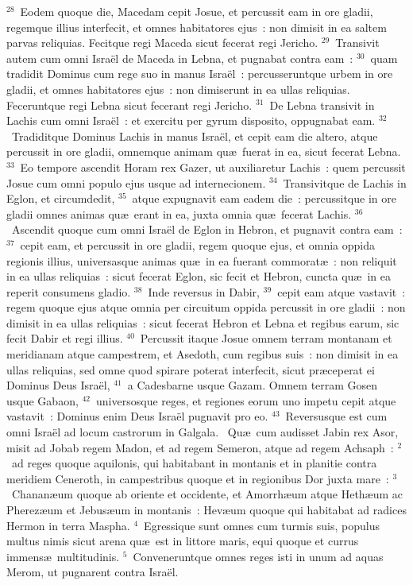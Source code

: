 ${}^{28}$~Eodem quoque die, Macedam cepit Josue, et percussit eam in ore gladii, regemque illius interfecit, et omnes habitatores ejus~: non dimisit in ea saltem parvas reliquias. Fecitque regi Maceda sicut fecerat regi Jericho.
${}^{29}$~Transivit autem cum omni Isra\"el de Maceda in Lebna, et pugnabat contra eam~:
${}^{30}$~quam tradidit Dominus cum rege suo in manus Isra\"el~: percusseruntque urbem in ore gladii, et omnes habitatores ejus~: non dimiserunt in ea ullas reliquias. Feceruntque regi Lebna sicut fecerant regi Jericho.
${}^{31}$~De Lebna transivit in Lachis cum omni Isra\"el~: et exercitu per gyrum disposito, oppugnabat eam.
${}^{32}$~Tradiditque Dominus Lachis in manus Isra\"el, et cepit eam die altero, atque percussit in ore gladii, omnemque animam qu\ae\ fuerat in ea, sicut fecerat Lebna.
${}^{33}$~Eo tempore ascendit Horam rex Gazer, ut auxiliaretur Lachis~: quem percussit Josue cum omni populo ejus usque ad internecionem.
${}^{34}$~Transivitque de Lachis in Eglon, et circumdedit,
${}^{35}$~atque expugnavit eam eadem die~: percussitque in ore gladii omnes animas qu\ae\ erant in ea, juxta omnia qu\ae\ fecerat Lachis.
${}^{36}$~Ascendit quoque cum omni Isra\"el de Eglon in Hebron, et pugnavit contra eam~:
${}^{37}$~cepit eam, et percussit in ore gladii, regem quoque ejus, et omnia oppida regionis illius, universasque animas qu\ae\ in ea fuerant commorat\ae~: non reliquit in ea ullas reliquias~: sicut fecerat Eglon, sic fecit et Hebron, cuncta qu\ae\ in ea reperit consumens gladio.
${}^{38}$~Inde reversus in Dabir,
${}^{39}$~cepit eam atque vastavit~: regem quoque ejus atque omnia per circuitum oppida percussit in ore gladii~: non dimisit in ea ullas reliquias~: sicut fecerat Hebron et Lebna et regibus earum, sic fecit Dabir et regi illius.
${}^{40}$~Percussit itaque Josue omnem terram montanam et meridianam atque campestrem, et Asedoth, cum regibus suis~: non dimisit in ea ullas reliquias, sed omne quod spirare poterat interfecit, sicut pr\ae ceperat ei Dominus Deus Isra\"el,
${}^{41}$~a Cadesbarne usque Gazam. Omnem terram Gosen usque Gabaon,
${}^{42}$~universosque reges, et regiones eorum uno impetu cepit atque vastavit~: Dominus enim Deus Isra\"el pugnavit pro eo.
${}^{43}$~Reversusque est cum omni Isra\"el ad locum castrorum in Galgala.
~\lettrine[lines=10,image=true,loversize=0.05,lraise=-0.03]{Q}{}u\ae\ cum audisset Jabin rex Asor, misit ad Jobab regem Madon, et ad regem Semeron, atque ad regem Achsaph~:
${}^{2}$~ad reges quoque aquilonis, qui habitabant in montanis et in planitie contra meridiem Ceneroth, in campestribus quoque et in regionibus Dor juxta mare~:
${}^{3}$~Chanan\ae um quoque ab oriente et occidente, et Amorrh\ae um atque Heth\ae um ac Pherez\ae um et Jebus\ae um in montanis~: Hev\ae um quoque qui habitabat ad radices Hermon in terra Maspha.
${}^{4}$~Egressique sunt omnes cum turmis suis, populus multus nimis sicut arena qu\ae\ est in littore maris, equi quoque et currus immens\ae\ multitudinis.
${}^{5}$~Conveneruntque omnes reges isti in unum ad aquas Merom, ut pugnarent contra Isra\"el.


